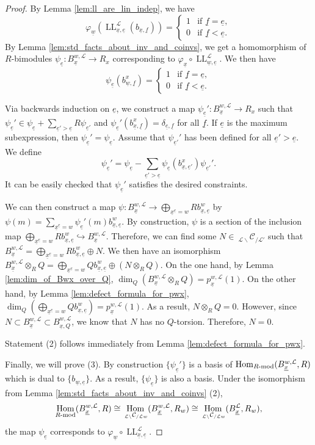 \documentclass{amsart}
\newcommand{\scrL}{\mathcal{L}}
\DeclareMathOperator{\Hom}{Hom}
\renewcommand{\mod}[1]{#1\textnormal{-mod}}
\DeclareMathOperator{\LL}{LL}
\newcommand{\Cmon}[2]{\:_{#1 \backslash} \mathcal{C}_{/ #2} }
\newcommand{\ue}{\underline{e}}
\newcommand{\uf}{\underline{f}}
\newcommand{\uw}{\underline{w}}
\newcommand{\ux}{\underline{x}}
\theoremstyle{definition}
\numberwithin{equation}{subsection}
\begin{document}
\begin{proof}
    By Lemma \ref{lem:ll_are_lin_indep}, we have
    \[\varphi_{\uw} \left( \LL_{\ux, \ue}^{\scrL} (b_{\ux, \uf}) \right) = \begin{cases} 1 & \text{if } \uf = \ue, \\ 0 & \text{if } \uf < \ue. \end{cases}\]
    By Lemma \ref{lem:std_facts_about_inv_and_coinvs}, we get a homomorphism of $R$-bimodules $\psi_{\ue} : B_{\ux}^{w, \scrL} \to R_x$ corresponding to $\varphi_{\ux} \circ \LL_{\uw, \ue}^{\scrL}$.
    We then have
    \[\psi_{\ue} (b_{\uw, \uf}^x) = \begin{cases} 1 & \text{if } \uf = \ue, \\ 0 & \text{if } \uf < \ue. \end{cases}\]

    Via backwards induction on $\ue$, we construct a map $\psi_{\ue}' : B_{\ux}^{w, \scrL} \to R_x$ such that $\psi_{\ue}' \in \psi_{\ue} + \sum_{\ue' > \ue} R\psi_{\ue'}$ and $\psi_{\ue}' (b_{\ux,\uf}^x) = \delta_{\ue, \uf}$ for all $\uf$.
    If $\ue$ is the maximum subexpression, then $\psi_{\ue}' = \psi_{\ue}$.
    Assume that $\psi_{\ue'}'$ has been defined for all $\ue' > \ue$. We define 
    \[\psi_{\ue}' = \psi_{\ue} - \sum_{\ue' > \ue} \psi_{\ue} (b_{\ux, \ue'}^x) \psi_{\ue'}'.\]
    It can be easily checked that $\psi_{\ue}'$ satisfies the desired constraints.
    
    We can then construct a map $\psi : B_{\ux}^{w, \scrL} \to \bigoplus_{\ux^{\ue} = w} R b_{\ux, \ue}^w$ by $\psi (m) = \sum_{\ux^{\ue} = w} \psi_{\ue}' (m) b_{\ux,\ue}^w$.
    By construction, $\psi$ is a section of the inclusion map $\bigoplus_{\ux^{\ue} = w} R b_{\ux, \ue}^w \hookrightarrow B_{\ux}^{w, \scrL}$.
    Therefore, we can find some $N \in \Cmon{\scrL}{\scrL'}$ such that $B_{\ux}^{w, \scrL} = \bigoplus_{\ux^{\ue} = w} R b_{\ux, \ue}^w \oplus N$.
    We then have an isomorphism $B_{\ux}^{w, \scrL} \otimes_R Q = \bigoplus_{\ux^{\ue} = w} Q b_{\ux, \ue}^w \oplus (N \otimes_R Q)$.
    On the one hand, by Lemma \ref{lem:dim_of_Bwx_over_Q}, $\dim_Q (B_{\ux}^{w, \scrL} \otimes_R Q) = p_{\ux}^{w, \scrL} (1)$.
    On the other hand, by Lemma \ref{lem:defect_formula_for_pwx}, $\dim_Q \left( \bigoplus_{\ux^{\ue} = w} Q b_{\ux, \ue}^w \right) = p_{\ux}^{w, \scrL} (1)$.
    As a result, $N \otimes_R Q = 0$. However, since $N \subset B_{\ux}^{w, \scrL} \subset B_{\ux, Q}^{w, \scrL}$, we know that $N$ has no $Q$-torsion. Therefore, $N = 0$.

    Statement (2) follows immediately from Lemma \ref{lem:defect_formula_for_pwx}. 

    Finally, we will prove (3). By construction $\{\psi_{\ue}'\}$ is a basis of $\Hom_{\mod{R}} (B_{\ux}^{w, \scrL}, R)$ which is dual to $\{b_{\uw, \ue}\}$.
    As a result, $\{\psi_{\ue}\}$ is also a basis. Under the isomorphism from Lemma \ref{lem:std_facts_about_inv_and_coinvs} (2),
    \[\Hom_{\mod{R}} (B_{\ux}^{w, \scrL} , R) \cong \Hom_{\Cmon{\scrL}{\scrL w}} (B_{\ux}^{w, \scrL} , R_w) \cong \Hom_{\Cmon{\scrL}{\scrL w}} (B_{\ux}^{\scrL}, R_w ),\]
    the map $\psi_{\ue}$ corresponds to $\varphi_{\uw} \circ \LL_{\ux, \ue}^{\scrL}$.  
\end{proof}
\end{document}
